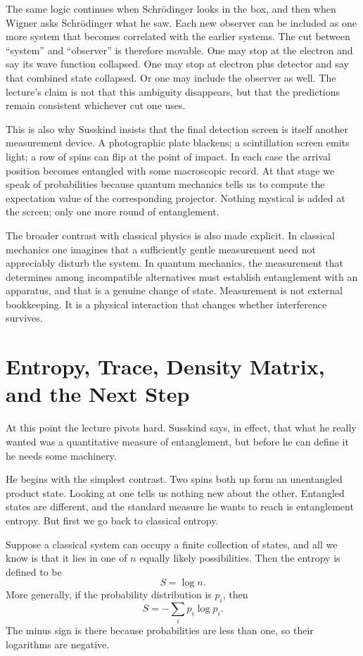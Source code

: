 The same logic continues when Schr\"odinger looks in the box, and then when Wigner asks Schr\"odinger what he saw. Each new observer can be included as one more system that becomes correlated with the earlier systems. The cut between ``system'' and ``observer'' is therefore movable. One may stop at the electron and say its wave function collapsed. One may stop at electron plus detector and say that combined state collapsed. Or one may include the observer as well. The lecture's claim is not that this ambiguity disappears, but that the predictions remain consistent whichever cut one uses.

This is also why Susskind insists that the final detection screen is itself another measurement device. A photographic plate blackens; a scintillation screen emits light; a row of spins can flip at the point of impact. In each case the arrival position becomes entangled with some macroscopic record. At that stage we speak of probabilities because quantum mechanics tells us to compute the expectation value of the corresponding projector. Nothing mystical is added at the screen; only one more round of entanglement.

The broader contrast with classical physics is also made explicit. In classical mechanics one imagines that a sufficiently gentle measurement need not appreciably disturb the system. In quantum mechanics, the measurement that determines among incompatible alternatives must establish entanglement with an apparatus, and that is a genuine change of state. Measurement is not external bookkeeping. It is a physical interaction that changes whether interference survives.

\section{Entropy, Trace, Density Matrix, and the Next Step}

At this point the lecture pivots hard. Susskind says, in effect, that what he really wanted was a quantitative measure of entanglement, but before he can define it he needs some machinery.

He begins with the simplest contrast. Two spins both up form an unentangled product state. Looking at one tells us nothing new about the other. Entangled states are different, and the standard measure he wants to reach is entanglement entropy. But first we go back to classical entropy.

Suppose a classical system can occupy a finite collection of states, and all we know is that it lies in one of \(n\) equally likely possibilities. Then the entropy is defined to be
\begin{equation}
S=\log n .
\end{equation}
More generally, if the probability distribution is \(p_i\), then
\begin{equation}
S=-\sum_i p_i\log p_i .
\end{equation}
The minus sign is there because probabilities are less than one, so their logarithms are negative.

